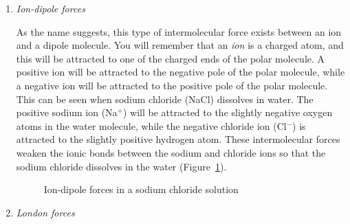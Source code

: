 \begin{enumerate}
\begin{enumerate}
\item{\textit{Ion-dipole forces}

As the name suggests, this type of intermolecular force exists between an ion and a dipole molecule. You will remember that an \textit{ion} is a charged atom, and this will be attracted to one of the charged ends of the polar molecule. A positive ion will be attracted to the negative pole of the polar molecule, while a negative ion will be attracted to the positive pole of the polar molecule. This can be seen when sodium chloride (NaCl) dissolves in water. The positive sodium ion (Na$^{+}$) will be attracted to the slightly negative oxygen atoms in the water molecule, while the negative chloride ion (Cl$^{-}$) is attracted to the slightly positive hydrogen atom. These intermolecular forces weaken the ionic bonds between the sodium and chloride ions so that the sodium chloride dissolves in the water (Figure~\ref{fig:ion-dipole}).

\begin{figure}[H]
\begin{center}
\caption{Ion-dipole forces in a sodium chloride solution}
\label{fig:ion-dipole}
\end{center}
\end{figure}
}

\item{\textit{London forces}}


\end{enumerate}
\end{enumerate}

